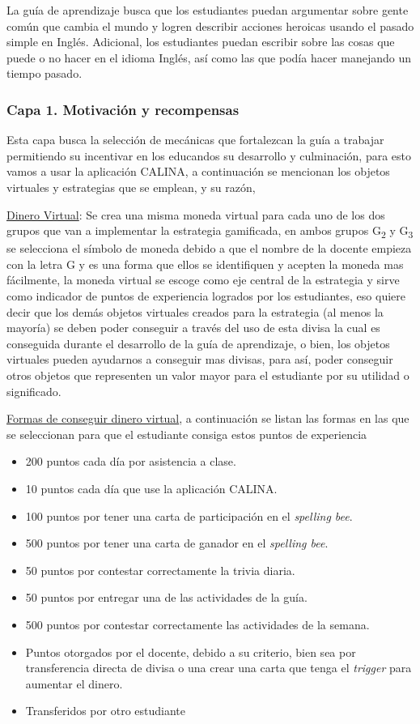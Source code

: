 La guía de aprendizaje busca que los estudiantes puedan argumentar sobre gente común que cambia el mundo y 
logren describir acciones heroicas usando el pasado simple en Inglés. Adicional, los estudiantes puedan 
escribir sobre las cosas que puede o no hacer en el idioma Inglés, así como las que podía hacer manejando un 
tiempo pasado.

\subsubsection{Capa 1. Motivación y recompensas}

Esta capa busca la selección de mecánicas que fortalezcan la guía a trabajar permitiendo su incentivar en los 
educandos su desarrollo y culminación, para esto vamos a usar la aplicación CALINA, a continuación se 
mencionan los objetos virtuales y estrategias que se emplean, y su razón,

\uline{Dinero Virtual}: Se crea una misma moneda virtual para cada uno de los dos grupos que van a implementar 
la estrategia gamificada, en ambos grupos G\textsubscript{2} y G\textsubscript{3} se selecciona el símbolo de 
moneda  debido a que el nombre de la docente empieza con la 
letra G y es una forma que ellos se identifiquen y acepten la moneda mas fácilmente, la moneda virtual se 
escoge como eje central de la estrategia y sirve como indicador de puntos de experiencia logrados por los 
estudiantes, eso quiere decir que los demás objetos virtuales creados para la estrategia (al menos la mayoría) 
se deben poder conseguir a través del uso de esta divisa la cual es conseguida durante el desarrollo de la 
guía de aprendizaje, o bien, los objetos virtuales pueden ayudarnos a conseguir mas divisas, para así, 
poder conseguir otros objetos que representen un valor mayor para el estudiante por su utilidad o significado.

\uline{Formas de conseguir dinero virtual}, a continuación se listan las formas en las que se seleccionan para 
que el estudiante consiga estos puntos de experiencia

\begin{itemize}
	\item 200 puntos cada día por asistencia a clase.
	\item 10 puntos cada día que use la aplicación CALINA.
	\item 100 puntos por tener una carta de participación en el \textit{spelling bee}.
	\item 500 puntos por tener una carta de ganador en el \textit{spelling bee}.
	\item 50 puntos por contestar correctamente la trivia diaria.
	\item 50 puntos por entregar una de las actividades de la guía.
	\item 500 puntos por contestar correctamente las actividades de la semana.
	\item Puntos otorgados por el docente, debido a su criterio, bien sea por transferencia directa de 
		divisa o una crear una carta que tenga el \textit{trigger} para aumentar el dinero.
	\item Transferidos por otro estudiante
\end{itemize}

